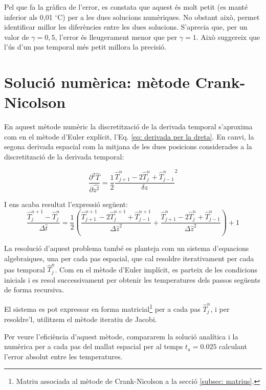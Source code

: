 \documentclass[11pt]{article}
\begin{document}
Pel que fa la gràfica de l'error, es constata que aquest és molt petit (es manté inferior als 0,01 $^\circ$C) per a les dues solucions numèriques. No obstant això, permet identificar millor les diferències entre les dues solucions. S'aprecia que, per un valor de $\gamma = 0,5$, l'error és lleugerament menor que per $\gamma = 1$. Això suggereix que l'ús d'un pas temporal més petit millora la precisió.

\section{Solució numèrica: mètode Crank-Nicolson}

En aquest mètode numèric la discretització de la derivada temporal s'aproxima com en el mètode d'Euler explícit, l'Eq. \eqref{eq: derivada per la dreta}. En canvi, la segona derivada espacial com la mitjana de les dues posicions considerades a la discretització de la derivada temporal:

\begin{equation}
    \frac{\partial^2\hat{T}}{\partial \hat{z^2}} = \frac{1}{2}\frac{\hat{T}_{j+1}^n-2\hat{T}_{j}^n+\hat{T}_{j-1}^n}{\delta z}^2
    \label{mitjana segones derivades espacials}
\end{equation}

I ens acaba resultat l'expressió següent:
\begin{equation}
    \frac{\hat{T}_j^{n+1}-\hat{T}_j^{n}}{\Delta\hat{t}} = {\frac{1}{2}}(\frac{\hat{T}_{j+1}^{n+1}-2\hat{T}_j^{n+1}+\hat{T}_{j-1}^{n+1}}{\Delta\hat{z}^2}+\frac{\hat{T}_{j+1}^{n}-2\hat{T}_j^{n}+\hat{T}_{j-1}^{n}}{\Delta\hat{z}^2}) + 1
    \label{discretitzacio crank-nicolson}
\end{equation}

La resolució d'aquest problema també es planteja com un sistema d'equacions algebraiques, una per cada pas espacial, que cal resoldre iterativament per cada pas temporal $\hat{T}_j^n$. Com en el mètode d'Euler implícit, es parteix de les condicions inicials i es resol successivament per obtenir les temperatures dels passos següents de forma recursiva.

El sistema es pot expressar en forma matricial\footnote{Matriu associada al mètode de Crank-Nicolson a la secció \ref{subsec: matrius}.} per a cada pas $\hat{T}_j^n$, i per resoldre'l, utilitzem el mètode iteratiu de Jacobi.

Per veure l'eficiència d'aquest mètode, compararem la solució analítica i la numèrica per a cada pas del 
mallat espacial per al temps $t_a = 0.025$ calculant l'error absolut entre les 
temperatures.
\end{document}
